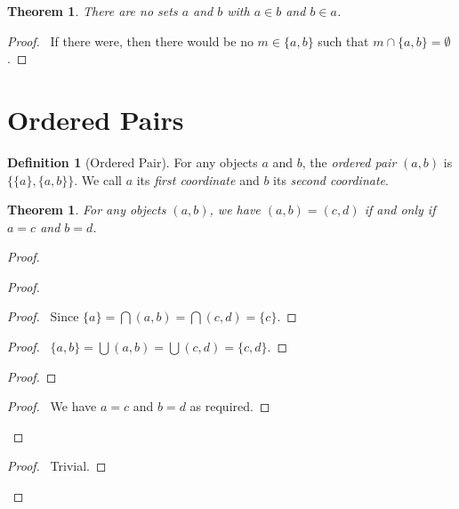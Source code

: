 \documentclass{article}
\let\qed\relax
\newtheorem{theorem}[axiom]{Theorem}
\theoremstyle{definition}
\newtheorem{definition}[axiom]{Definition}
\begin{document}
    \begin{theorem}
        There are no sets $a$ and $b$ with $a \in b$ and $b \in a$.
    \end{theorem}

    \begin{proof}
        \pf\ If there were, then there would be no $m \in \{ a,b \}$ such that  $m \cap \{ a,b \} = \emptyset$. \qed
    \end{proof}

    \section{Ordered Pairs}

    \begin{definition}[Ordered Pair]
        For any objects $a$ and $b$, the \emph{ordered pair} $(a,b)$ is $\{ \{ a \}, \{a, b \} \}$.
        We call $a$ its \emph{first coordinate} and $b$ its \emph{second coordinate}.
    \end{definition}

    \begin{theorem}
        For any objects $(a,b)$, we have $(a,b) = (c,d)$ if and only if $a = c$ and $b = d$.
    \end{theorem}

    \begin{proof}
        \pf
        \begin{proof}
            \begin{proof}
                \pf\ Since $\{a\} = \bigcap (a,b) = \bigcap (c,d) = \{c\}$.
            \end{proof}
            \begin{proof}
                \pf\ $\{a,b\} = \bigcup (a,b) = \bigcup (c,d) = \{c,d\}$.
            \end{proof}
            \begin{proof}
            \end{proof}
            \begin{proof}
                \pf\ We have $a = c$ and $b = d$ as required.
            \end{proof}
        \end{proof}
        \begin{proof}
            \pf\ Trivial.
        \end{proof}
        \qed
    \end{proof}
\end{document}
